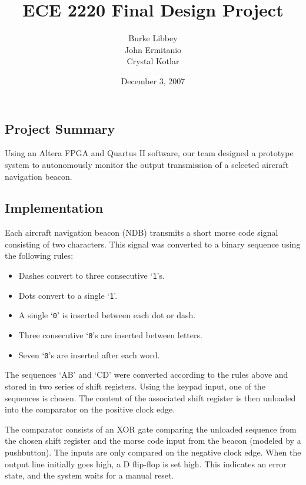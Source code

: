 \documentclass[12pt,letterpaper,titlepage]{article}
\begin{document}

\title{ECE 2220 Final Design Project}
\author{Burke Libbey \\ John Ermitanio \\ Crystal Kotlar}
\date{December 3, 2007}
\maketitle



\subsection*{Project Summary}

Using an Altera FPGA and Quartus II software, our team designed a prototype system to autonomously monitor the output transmission of a selected aircraft navigation beacon.


\subsection*{Implementation}

Each aircraft navigation beacon (NDB) transmits a short morse code signal consisting of two characters. This signal was converted to a binary sequence using the following rules:
\begin{itemize}
\small
\item Dashes convert to three consecutive `\texttt{1}'s.
\item Dots convert to a single `\texttt{1}'.
\item A single `\texttt{0}' is inserted between each dot or dash.
\item Three consecutive `\texttt{0}'s are inserted between letters.
\item Seven `\texttt{0}'s are inserted after each word.
\end{itemize}
The sequences `AB' and `CD' were converted according to the rules above and stored in two series of shift registers. Using the keypad input, one of the sequences is chosen. The content of the associated shift register is then unloaded into the comparator on the positive clock edge.

The comparator consists of an XOR gate comparing the unloaded sequence from the chosen shift register and the morse code input from the beacon (modeled by a pushbutton). The inputs are only compared on the negative clock edge. When the output line initially goes high, a D flip-flop is set high. This indicates an error state, and the system waits for a manual reset.


\end{document}
